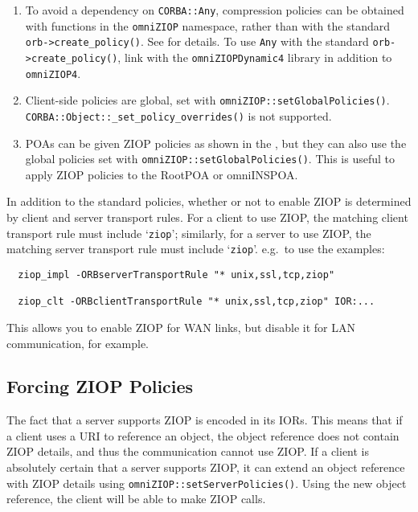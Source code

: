 \documentclass[11pt,oneside,a4paper]{book}
\newcommand{\code}[1]{\texttt{#1}}
\newcommand{\op}[1]{\texttt{#1()}}
\newcommand{\dsc}{\discretionary{}{}{}}
\begin{document}
\begin{enumerate}
\item To avoid a dependency on \code{CORBA::Any}, compression policies
  can be obtained with functions in the \code{omniZIOP} namespace,
  rather than with the standard \op{orb->create\_policy}. See
   for details. To use \code{Any}
  with the standard \op{orb->create\_policy}, link with the
  \code{omniZIOPDynamic4} library in addition to \code{omniZIOP4}.

\item Client-side policies are global, set with
  \op{omniZIOP::setGlobalPolicies}.
  \op{CORBA::Object::\_set\_policy\_overrides} is not supported.

\item POAs can be given ZIOP policies as shown in the
  , but they can also use the
  global policies set with \op{omniZIOP::\dsc{}setGlobalPolicies}.  This
  is useful to apply ZIOP policies to the RootPOA or omniINSPOA.
\end{enumerate}

\noindent In addition to the standard policies, whether or not to
enable ZIOP is determined by client and server transport rules. For a
client to use ZIOP, the matching client transport rule must include
`\code{ziop}'; similarly, for a server to use ZIOP, the matching
server transport rule must include `\code{ziop}'. e.g.\ to use the
examples:

\begin{verbatim}
  ziop_impl -ORBserverTransportRule "* unix,ssl,tcp,ziop"

  ziop_clt -ORBclientTransportRule "* unix,ssl,tcp,ziop" IOR:...
\end{verbatim}

\noindent This allows you to enable ZIOP for WAN links, but disable it
for LAN communication, for example.


\subsection{Forcing ZIOP Policies}

The fact that a server supports ZIOP is encoded in its IORs. This
means that if a client uses a  URI to reference an
object, the object reference does not contain ZIOP details, and thus
the communication cannot use ZIOP. If a client is absolutely certain
that a server supports ZIOP, it can extend an object reference with
ZIOP details using \op{omniZIOP::setServerPolicies}. Using the new
object reference, the client will be able to make ZIOP calls.
\end{document}
